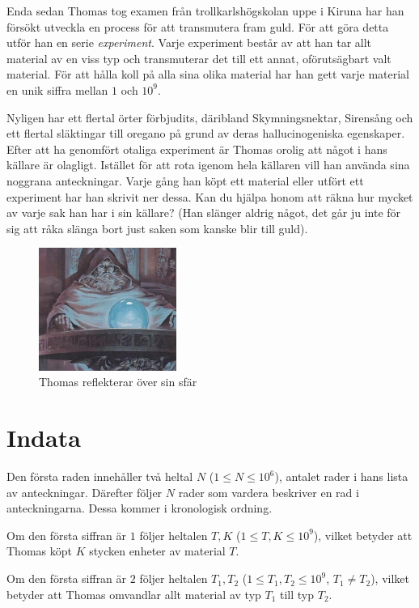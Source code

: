 Enda sedan Thomas tog examen från trollkarlshögskolan uppe i Kiruna har han försökt utveckla en process för att transmutera fram guld. För att göra detta utför
han en serie \textit{experiment}. Varje experiment består av att han tar allt material av en viss typ och transmuterar det till ett annat, oförutsägbart valt
material. För att hålla koll på alla sina olika material har han gett varje material en unik siffra mellan $1$ och $10^9$. 

Nyligen har ett flertal örter förbjudits, däribland Skymningsnektar, Sirensång och ett flertal släktingar till oregano på grund av deras
hallucinogeniska egenskaper. Efter att ha genomfört otaliga experiment är Thomas orolig att något i hans källare är olagligt. Istället för att rota
igenom hela källaren vill han använda sina noggrana anteckningar. Varje gång han köpt ett material eller utfört ett experiment har han skrivit ner dessa.
Kan du hjälpa honom att räkna hur mycket av varje sak han har i sin källare? (Han slänger aldrig något, det går ju inte för sig att råka slänga bort
just saken som kanske blir till guld).

\begin{figure}
    \centering
        \includegraphics[width=0.4\textwidth]{thomas.jpg}
    \caption{Thomas reflekterar över sin sfär}
\end{figure}

\section*{Indata}
Den första raden innehåller två heltal $N$ ($1 \leq N \leq 10^6$), antalet rader i hans lista av anteckningar.
Därefter följer $N$ rader som vardera beskriver en rad i anteckningarna. Dessa kommer i kronologisk ordning.

Om den första siffran är $1$ följer heltalen $T,K$ ($1 \leq T, K \leq 10^9$), vilket betyder att Thomas köpt $K$ stycken enheter av material $T$.

Om den första siffran är $2$ följer heltalen $T_1, T_2$ ($1 \leq T_1, T_2 \leq 10^9$, $T_1 \neq T_2$), vilket betyder att Thomas omvandlar allt material av typ $T_1$ till typ $T_2$.


